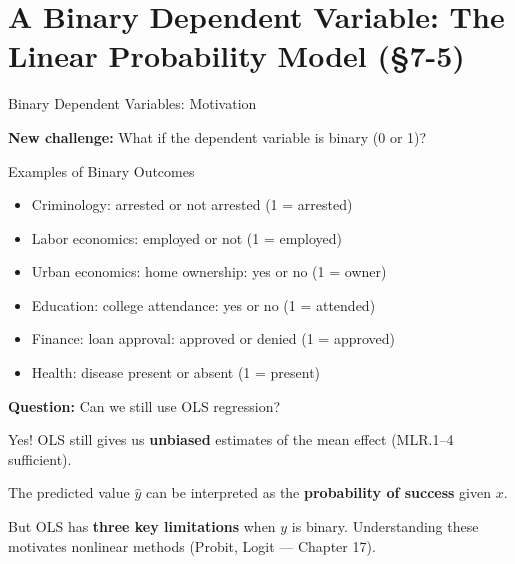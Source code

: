 \documentclass[aspectratio=169, 12pt]{beamer}
\begin{document}
\section{A Binary Dependent Variable: The Linear Probability Model (\S7-5)}

\begin{frame}[shrink=20]{Binary Dependent Variables: Motivation}

  \textbf{New challenge:} What if the dependent variable is binary (0 or 1)?

  \medskip

  \begin{examplebox}{Examples of Binary Outcomes}
    \begin{itemize}
      \item Criminology: arrested or not arrested (1 = arrested)
      \item Labor economics: employed or not (1 = employed)
      \item Urban economics: home ownership: yes or no (1 = owner)
      \item Education: college attendance: yes or no (1 = attended)
      \item Finance: loan approval: approved or denied (1 = approved)
      \item Health: disease present or absent (1 = present)
    \end{itemize}
  \end{examplebox}

  \medskip

  \textbf{Question:} Can we still use OLS regression?

  \medskip

  \begin{highlightbox}
    Yes! OLS still gives us \textbf{unbiased} estimates of the mean effect (MLR.1–4 sufficient).

    The predicted value $\hat{y}$ can be interpreted as the \textbf{probability of success} given $x$.
  \end{highlightbox}

  \medskip

  \begin{keybox}
    But OLS has \textbf{three key limitations} when $y$ is binary. Understanding these motivates nonlinear methods (Probit, Logit — Chapter 17).
  \end{keybox}

\end{frame}
\end{document}
